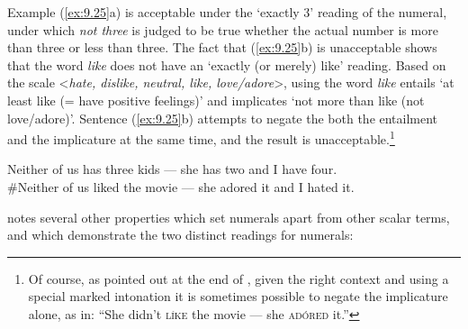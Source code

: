 Example (\ref{ex:9.25}a) is acceptable under the ‘exactly 3’ reading of the numeral, under which \textit{not three} is judged to be true whether the actual number is more than three or less than three. The fact that (\ref{ex:9.25}b) is unacceptable shows that the word \textit{like} does not have an ‘exactly (or merely) like’ reading. Based on the scale <\textit{hate, dislike, neutral, like, love/adore}>, using the word \textit{like} entails ‘at least like (= have positive feelings)’ and implicates ‘not more than like (not love/adore)’. Sentence (\ref{ex:9.25}b) attempts to negate the both the entailment and the implicature at the same time, and the result is unacceptable.\footnote{Of course, as pointed out at the end of , given the right context and using a special marked intonation it is sometimes possible to negate the implicature alone, as in: “She didn’t \textsc{líke} the movie — she \textsc{adóred} it.”}


\ea \label{ex:9.25}
\ea Neither of us has three kids — she has two and I have four.\\
\ex \#Neither of us liked the movie — she adored it and I hated it.
                       \z
\z


\citet{Horn1992} notes several other properties which set numerals apart from other scalar terms, and which demonstrate the two distinct readings for numerals:


